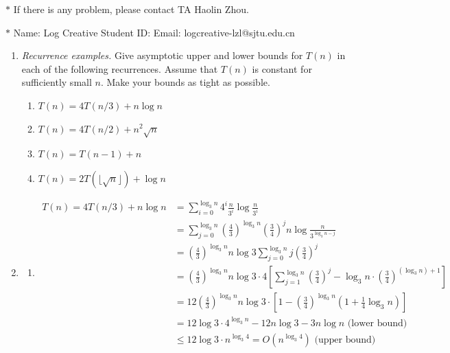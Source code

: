 \documentclass[12pt,a4paper]{article}
\makeatletter
\newtheorem*{solution}{Solution}
\theoremstyle{definition}
\renewenvironment{solution}[1][Solution] {\par\pushQED{\qed}\normalfont\topsep6\p@\@plus6\p@\relax\trivlist\item[\hskip\labelsep\bfseries#1\@addpunct{.}]\ignorespaces}{\popQED\endtrivlist\@endpefalse} \makeatother
\makeatother
\begin{document}
\noindent

\noindent{}
\begin{center}
\footnotesize{\color{red}$*$ If there is any problem, please contact TA Haolin Zhou. }

\footnotesize{\color{blue}$*$ Name: Log Creative  \quad Student ID:  \quad Email: logcreative-lzl@sjtu.edu.cn}
\end{center}

\begin{enumerate}
\item
    \textit{Recurrence examples.} Give asymptotic upper and lower bounds for $T(n)$ in each of the following recurrences. Assume that $T(n)$ is constant for sufficiently small $n$. Make your bounds as tight as possible.
\begin{enumerate}
	\item $T(n)=4 T(n / 3)+n \log n$
	\item $T(n)=4 T(n / 2)+n^{2} \sqrt{n}$
	\item $T(n)=T(n-1)+n$	
	\item $T(n)=2T(\lfloor \sqrt n\rfloor)+\log n$
\end{enumerate}
\begin{solution}
    \begin{enumerate}
        \item 
            \begin{align*}
                T(n) = 4 T(n / 3)+n \log n &= \sum_{i=0}^{\log_3 n}4^i \frac{n}{3^i}\log\frac{n}{3^i} \\&= \sum_{j=0}^{\log_3 n}\left(\frac{4}{3}\right)^{\log_3 n} \left(\frac{3}{4}\right)^j n\log\frac{n}{3^{\log_3 n-j}} \\
                &=\left(\frac{4}{3}\right)^{\log_3 n} n\log 3 \sum_{j=0}^{\log_3 n}j\left(\frac{3}{4}\right)^j \\
                &= \left(\frac{4}{3}\right)^{\log_3 n} n\log 3\cdot 4 \left[\sum_{j=1}^{\log_3 n}\left(\frac{3}{4}\right)^j - \log_3 n \cdot \left(\frac{3}{4}\right)^{(\log_3 n) +1}\right]\\
                &=12\left(\frac{4}{3}\right)^{\log_3 n} n\log 3 \cdot \left[1-\left(\frac{3}{4}\right)^{\log_3 n}\left(1+\frac{1}{4}\log_3 n \right)\right]\\
                &=12\log 3\cdot 4^{\log_3 n} - 12 n\log 3 - 3n\log n \text{ (lower bound)}\\
                &\leq 12\log 3\cdot n^{\log_3 4} = O(n^{\log_3 4}) \text{ (upper bound)}
            \end{align*}


\end{enumerate}
\end{solution}
\end{enumerate}
\end{document}
